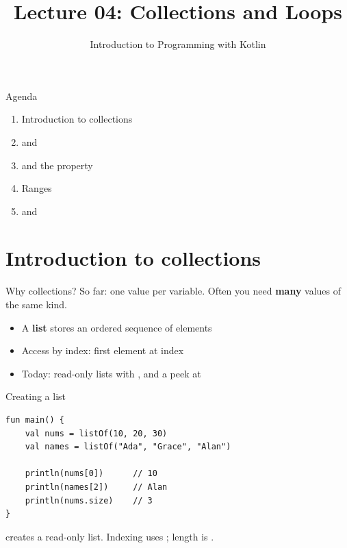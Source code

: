 \documentclass[aspectratio=169,11pt]{beamer}
\title{Lecture 04: Collections and Loops}
\subtitle{Introduction to Programming with Kotlin}
\begin{document}
    \begin{frame}
        \titlepage
    \end{frame}

    \begin{frame}{Agenda}
        \begin{enumerate}
            \item Introduction to collections
            \item {} and 
            \item {} and the  property
            \item Ranges
            \item {} and 
        \end{enumerate}
    \end{frame}

    \section{Introduction to collections}

    \begin{frame}{Why collections?}
        So far: one value per variable.
        Often you need \textbf{many} values of the same kind.
        \vspace{0.6em}
        \begin{itemize}
            \item A \textbf{list} stores an ordered sequence of elements
            \item Access by index: first element at index 
            \item Today: read-only lists with , and a peek at
        \end{itemize}
    \end{frame}

    \begin{frame}[fragile]{Creating a list}
        \begin{lstlisting}
fun main() {
    val nums = listOf(10, 20, 30)
    val names = listOf("Ada", "Grace", "Alan")

    println(nums[0])      // 10
    println(names[2])     // Alan
    println(nums.size)    // 3
}
        \end{lstlisting}
        \vspace{0.3em}
         creates a read-only list.
        Indexing uses \kotlincode{[i]}; length is .
    \end{frame}
\end{document}
